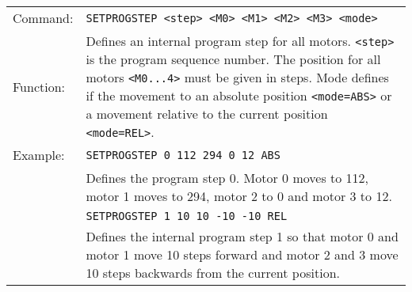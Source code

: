 \begin{table}[h]
  \begin{tabularx}{\textwidth}{lX}
    Command:  & \texttt{SETPROGSTEP <step> <M0> <M1> <M2> <M3> <mode>}\\
    Function: & Defines an internal program step for all motors. \texttt{<step>}
                is the program sequence number. The position for all motors 
                \texttt{<M0...4>} must be given in steps. Mode defines if
                the movement to an absolute position \texttt{<mode=ABS>}
                or a movement relative to the current position \texttt{<mode=REL>}.\\
    Example:  & \texttt{SETPROGSTEP 0 112 294 0 12 ABS}\\
              & Defines the program step 0. Motor 0 moves to 112,
                motor 1 moves to 294, motor 2 to 0 and motor 3 to 12.\\
              & \texttt{SETPROGSTEP 1 10 10 -10 -10 REL}\\
              & Defines the internal program step 1 so that motor 0 and motor 1 move
                10 steps forward and motor 2 and 3 move 10 steps backwards from the
                current position.
  \end{tabularx}
\end{table}

\newpage

